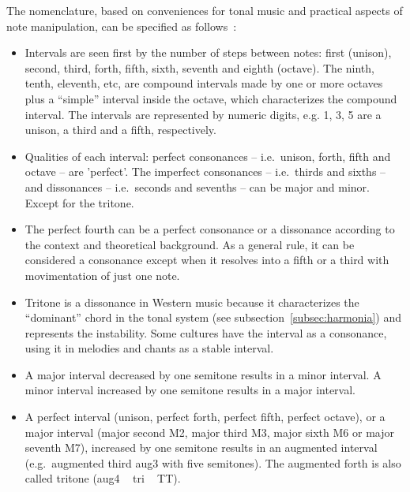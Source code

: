 The nomenclature, based on conveniences for tonal music and practical aspects of note manipulation, can be specified
as follows~\cite{Roederer,Wisnick}:

\begin{itemize}
                \item Intervals are seen first by the number of steps between notes: first (unison), second, third, forth, fifth, sixth, seventh and eighth (octave). The ninth, tenth, eleventh, etc, are compound intervals made by one or more octaves plus a ``simple'' interval inside the octave, which characterizes the compound interval. The intervals are represented by numeric digits, e.g. 1, 3, 5 are a unison, a third and a fifth, respectively.

                \item Qualities of each interval: perfect consonances --
                i.e.\ unison, forth, fifth and octave -- are 'perfect'. The imperfect consonances -- i.e.\ thirds and sixths -- and dissonances -- i.e.\ seconds and sevenths -- can be major and                 minor. Except for the tritone.

                \item The perfect fourth can be a perfect consonance or a dissonance according to the context and theoretical background. As a general rule, it can be considered a consonance except when it resolves into a fifth or a third with movimentation of just one note.

                \item Tritone is a dissonance in Western music because
                it characterizes the ``dominant'' chord in the tonal system (see subsection~\ref{subsec:harmonia}) and represents the    instability. Some cultures have the interval as a consonance,                 using it in melodies and chants as a stable interval. 

                \item A major interval decreased by one semitone results in a minor interval. A minor interval increased by one semitone results in a major interval.

                \item A perfect interval (unison, perfect forth, perfect fifth, perfect octave), or a major interval (major second M2,
major third M3, major sixth M6 or major seventh M7), increased
by one semitone results in an augmented interval (e.g.\
augmented third aug3 with five semitones). The augmented forth
is also called tritone (aug4 ~ tri ~ TT).


\end{itemize}
